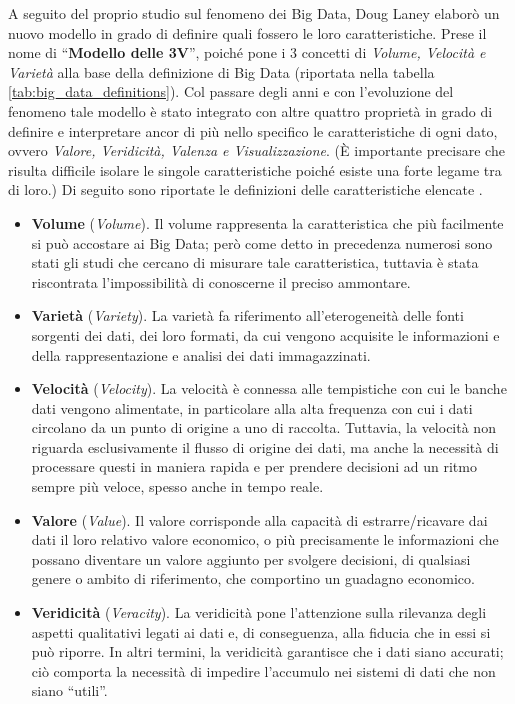A seguito del proprio studio sul fenomeno dei Big Data, Doug Laney elaborò un nuovo modello in grado di definire quali fossero le loro caratteristiche. Prese il nome di “\textbf{Modello delle 3V}”, poiché pone i 3 concetti di \textit{Volume, Velocità e Varietà} alla base della definizione di Big Data (riportata nella tabella \ref{tab:big_data_definitions}). Col passare degli anni e con l'evoluzione del fenomeno tale modello è stato integrato con altre quattro proprietà in grado di definire e interpretare ancor di più nello specifico le caratteristiche di ogni dato, ovvero \textit{Valore, Veridicità, Valenza e Visualizzazione}. (È importante precisare che risulta difficile isolare le singole caratteristiche poiché esiste una forte legame tra di loro.) Di seguito sono riportate le definizioni delle caratteristiche elencate \cite{agcom_big_data}.
\begin{itemize}
    \item \textbf{Volume} (\textit{Volume}). Il volume rappresenta la caratteristica che più facilmente si può accostare ai Big Data; però come detto in precedenza numerosi sono stati gli studi che cercano di misurare tale caratteristica, tuttavia è stata riscontrata l'impossibilità di conoscerne il preciso ammontare.
    \item \textbf{Varietà} (\textit{Variety}). La varietà fa riferimento all'eterogeneità delle fonti sorgenti dei dati, dei loro formati, da cui vengono acquisite le informazioni e della rappresentazione e analisi dei dati immagazzinati.
    \item \textbf{Velocità} (\textit{Velocity}). La velocità è connessa alle tempistiche con cui le banche dati vengono alimentate, in particolare alla alta frequenza con cui i dati circolano da un punto di origine a uno di raccolta. Tuttavia, la velocità non riguarda esclusivamente il flusso di origine dei dati, ma anche la necessità di processare questi in maniera rapida e per prendere decisioni ad un ritmo sempre più veloce, spesso anche in tempo reale.
    \item \textbf{Valore} (\textit{Value}). Il valore corrisponde alla capacità di estrarre/ricavare dai dati il loro relativo valore economico, o più precisamente le informazioni che possano diventare un valore aggiunto per svolgere decisioni, di qualsiasi genere o ambito di riferimento, che comportino un guadagno economico. 
    \item \textbf{Veridicità} (\textit{Veracity}). La veridicità pone l'attenzione sulla rilevanza degli aspetti qualitativi legati ai dati e, di conseguenza, alla fiducia che in essi si può riporre. In altri termini, la veridicità garantisce che i dati siano accurati; ciò comporta la necessità di impedire l'accumulo nei sistemi di dati che non siano “utili”.

\end{itemize}
